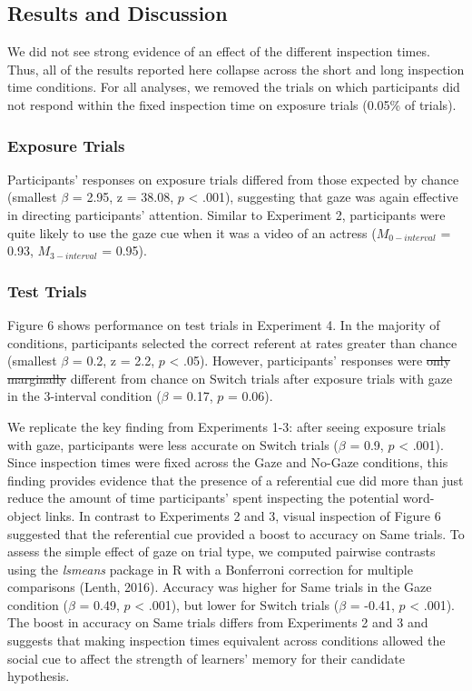 \documentclass[authoryear, review]{elsarticle}
\providecommand{\DIFaddtex}[1]{{\protect\color{blue}\uwave{#1}}} %
\providecommand{\DIFdeltex}[1]{{\protect\color{red}\sout{#1}}}                      %
\providecommand{\DIFaddbegin}{} %
\providecommand{\DIFaddend}{} %
\providecommand{\DIFdelbegin}{} %
\providecommand{\DIFdelend}{} %
\providecommand{\DIFadd}[1]{\texorpdfstring{\DIFaddtex{#1}}{#1}} %
\providecommand{\DIFdel}[1]{\texorpdfstring{\DIFdeltex{#1}}{}} %
\begin{document}
\subsection{Results and Discussion}\label{results-and-discussion-3}

We did not see strong evidence of an effect of the different inspection
times. Thus, all of the results reported here collapse across the short
and long inspection time conditions. For all analyses, we removed the
trials on which participants did not respond within the fixed inspection
time on exposure trials (0.05\% of trials).

\subsubsection{Exposure Trials}\label{exposure-trials-3}

Participants' responses on exposure trials differed from those expected
by chance (smallest \(\beta\) = 2.95, z = 38.08, \(p\) \textless{}
.001), suggesting that gaze was again effective in directing
participants' attention. Similar to Experiment 2, participants were
quite likely to use the gaze cue when it was a video of an actress
(\(M_{0-interval}\) = 0.93, \(M_{3-interval}\) = 0.95).

\subsubsection{Test Trials}\label{test-trials-3}

Figure 6 shows performance on test trials in Experiment 4. In the
majority of conditions, participants selected the correct referent at
rates greater than chance (smallest \(\beta\) = 0.2, z = 2.2, \(p\)
\textless{} .05). However, participants' responses were \DIFdelbegin \DIFdel{only marginally
}\DIFdelend \DIFaddbegin \DIFadd{not }\DIFaddend different
from chance on Switch trials after exposure trials with gaze in the
3-interval condition (\(\beta\) = 0.17, \(p\) = 0.06).

We replicate the key finding from Experiments 1-3: after seeing exposure
trials with gaze, participants were less accurate on Switch trials
(\(\beta\) = 0.9, \(p\) \textless{} .001). Since inspection times were
fixed across the Gaze and No-Gaze conditions, this finding provides
evidence that the presence of a referential cue did more than just
reduce the amount of time participants' spent inspecting the potential
word-object links. In contrast to Experiments 2 and 3, visual inspection
of Figure 6 suggested that the referential cue provided a boost to
accuracy on Same trials. To assess the simple effect of gaze on trial
type, we computed pairwise contrasts using the \emph{lsmeans} package in
R with a Bonferroni correction for multiple comparisons (Lenth, 2016).
Accuracy was higher for Same trials in the Gaze condition (\(\beta\) =
0.49, \(p\) \textless{} .001), but lower for Switch trials (\(\beta\) =
-0.41, \(p\) \textless{} .001). The boost in accuracy on Same trials
differs from Experiments 2 and 3 and suggests that making inspection
times equivalent across conditions allowed the social cue to affect the
strength of learners' memory for their candidate hypothesis.
\end{document}
